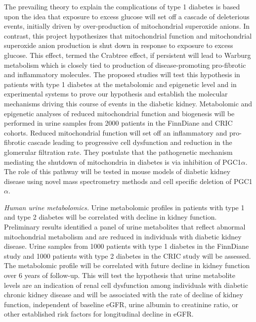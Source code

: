 \documentclass[arial,11pt]{article}
\begin{document}
The prevailing theory to explain the complications of type 1 diabetes is based upon the idea that exposure to excess glucose will set off a cascade of deleterious events, initially driven by over-production of mitochondrial superoxide anions. In contrast, this project hypothesizes that mitochondrial function and mitochondrial superoxide anion production is shut down in response to exposure to excess glucose. This effect, termed the Crabtree effect, if persistent will lead to Warburg metabolism which is closely tied to production of disease-promoting pro-fibrotic and inflammatory molecules.
The proposed studies will test this hypothesis in patients with type 1 diabetes at the metabolomic and epigenetic level and in experimental systems to prove our hypothesis and establish the molecular mechanisms driving this course of events in the diabetic kidney. Metabolomic and epigenetic analyses of reduced mitochondrial function and biogenesis will be performed in urine samples from 2000 patients in the FinnDiane and CRIC cohorts. Reduced mitochondrial function will set off an inflammatory and pro-fibrotic cascade leading to progressive cell dysfunction and reduction in the glomerular filtration rate. They postulate that the pathogenetic mechanism mediating the shutdown of mitochondria in diabetes is via inhibition of \mbox{PGC1$\alpha$}. The role of this pathway will be tested in mouse models of diabetic kidney disease using novel mass spectrometry methods and cell specific deletion of \mbox{PGC1$\alpha$}.

{\em Human urine metabolomics.} Urine metabolomic profiles in patients with type 1 and type 2 diabetes will be correlated with decline in kidney function. Preliminary results identified a panel of urine metabolites that reflect abnormal mitochondrial metabolism and are reduced in individuals with diabetic kidney disease. Urine samples from 1000 patients with type 1 diabetes in the FinnDiane study and 1000 patients with type 2 diabetes in the CRIC study will be assessed. The metabolomic profile will be correlated with future decline in kidney function over 6 years of follow-up. This will test the hypothesis that urine metabolite levels are an indication of renal cell dysfunction among individuals with diabetic chronic kidney disease and will be associated with the rate of decline of kidney function, independent of baseline eGFR, urine albumin to creatinine ratio, or other established risk factors for longitudinal decline in eGFR.
\end{document}
